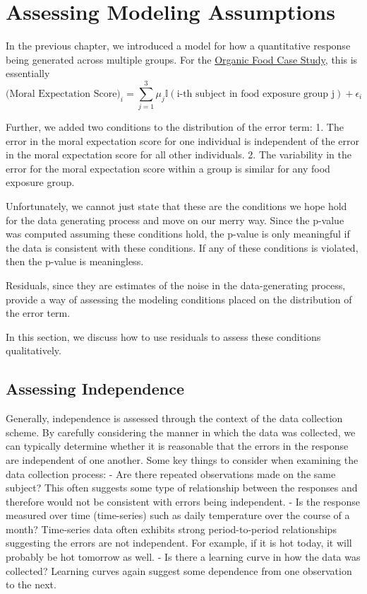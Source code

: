 \documentclass[]{book}
\theoremstyle{definition}
\theoremstyle{definition}
\theoremstyle{remark}
\let\BeginKnitrBlock\begin \let\EndKnitrBlock\end
\begin{document}
\chapter{Assessing Modeling Assumptions}\label{ANOVAassessment}

In the previous chapter, we introduced a model for how a quantitative
response being generated across multiple groups. For the
\protect\hyperlink{CaseOrganic}{Organic Food Case Study}, this is
essentially \[
\text{(Moral Expectation Score)}_i = \sum_{j=1}^3 \mu_j \mathbb{I}(\text{i-th subject in food exposure group j}) + \epsilon_i
\]

Further, we added two conditions to the distribution of the error term:
1. The error in the moral expectation score for one individual is
independent of the error in the moral expectation score for all other
individuals. 2. The variability in the error for the moral expectation
score within a group is similar for any food exposure group.

Unfortunately, we cannot just state that these are the conditions we
hope hold for the data generating process and move on our merry way.
Since the p-value was computed assuming these conditions hold, the
p-value is only meaningful if the data is consistent with these
conditions. If any of these conditions is violated, then the p-value is
meaningless.

\BeginKnitrBlock{rmdkeyidea}
Residuals, since they are estimates of the noise in the data-generating
process, provide a way of assessing the modeling conditions placed on
the distribution of the error term.
\EndKnitrBlock{rmdkeyidea}

In this section, we discuss how to use residuals to assess these
conditions qualitatively.

\section{Assessing Independence}\label{assessing-independence}

Generally, independence is assessed through the context of the data
collection scheme. By carefully considering the manner in which the data
was collected, we can typically determine whether it is reasonable that
the errors in the response are independent of one another. Some key
things to consider when examining the data collection process: - Are
there repeated observations made on the same subject? This often
suggests some type of relationship between the responses and therefore
would not be consistent with errors being independent. - Is the response
measured over time (time-series) such as daily temperature over the
course of a month? Time-series data often exhibits strong
period-to-period relationships suggesting the errors are not
independent. For example, if it is hot today, it will probably be hot
tomorrow as well. - Is there a learning curve in how the data was
collected? Learning curves again suggest some dependence from one
observation to the next.
\end{document}
